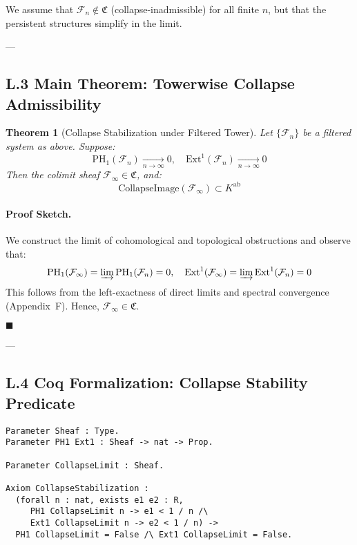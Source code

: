 \documentclass[11pt]{article}
\newtheorem{theorem}{Theorem}[section]
\begin{document}
We assume that \( \mathcal{F}_n \notin \mathfrak{C} \) (collapse-inadmissible) for all finite \( n \), but that the persistent structures simplify in the limit.

---

\subsection*{L.3 Main Theorem: Towerwise Collapse Admissibility}

\begin{theorem}[Collapse Stabilization under Filtered Tower]
\label{thm:tower-collapse}
Let \( \{ \mathcal{F}_n \} \) be a filtered system as above.  
Suppose:
\[
\mathrm{PH}_1(\mathcal{F}_n) \xrightarrow[n \to \infty]{} 0, \quad \mathrm{Ext}^1(\mathcal{F}_n) \xrightarrow[n \to \infty]{} 0
\]
Then the colimit sheaf \( \mathcal{F}_\infty \in \mathfrak{C} \), and:
\[
\text{CollapseImage}(\mathcal{F}_\infty) \subset K^{\mathrm{ab}}
\]
\end{theorem}

\paragraph{Proof Sketch.}  
We construct the limit of cohomological and topological obstructions and observe that:
\[
\mathrm{PH}_1(\mathcal{F}_\infty) = \varinjlim \mathrm{PH}_1(\mathcal{F}_n) = 0, \quad
\mathrm{Ext}^1(\mathcal{F}_\infty) = \varinjlim \mathrm{Ext}^1(\mathcal{F}_n) = 0
\]
This follows from the left-exactness of direct limits and spectral convergence (Appendix~F). Hence, \( \mathcal{F}_\infty \in \mathfrak{C} \).

\hfill \( \blacksquare \)

---

\subsection*{L.4 Coq Formalization: Collapse Stability Predicate}

\begin{lstlisting}[language=Coq, caption={Coq: Collapse Admissibility under Colimit}]
Parameter Sheaf : Type.
Parameter PH1 Ext1 : Sheaf -> nat -> Prop.

Parameter CollapseLimit : Sheaf.

Axiom CollapseStabilization :
  (forall n : nat, exists e1 e2 : R,
     PH1 CollapseLimit n -> e1 < 1 / n /\
     Ext1 CollapseLimit n -> e2 < 1 / n) ->
  PH1 CollapseLimit = False /\ Ext1 CollapseLimit = False.
\end{lstlisting}
\end{document}
